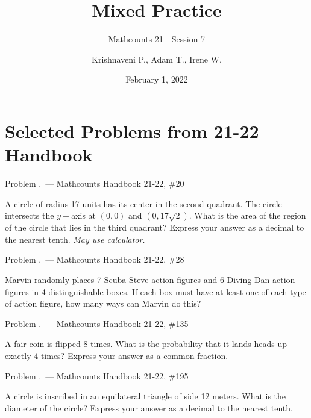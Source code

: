 \documentclass[9pt]{beamer}
\title{Mixed Practice}
\subtitle{Mathcounts 21 - Session 7}
\author{Krishnaveni P., Adam T., Irene W.}
\institute{BISV Mathcounts Club 21}
\date{February 1, 2022}
\newcounter{problem}[section]
\begin{document}
\begin{frame}
    \titlepage        
\end{frame}
\section{Selected Problems from 21-22 Handbook}
\begin{frame}[t, fragile]{Problem \thesection.\theproblem\ ---  Mathcounts Handbook 21-22, \#20}
    \begin{block}{}
    A circle of radius 17 units has its center in the second quadrant. The circle intersects the $y-$axis at $(0, 0)$ and $(0, 17\sqrt{2})$. What is the area of the region of the circle that lies in the third quadrant? Express your answer as a decimal to the nearest tenth. \textit{May use calculator.}
	
    \end{block}
\end{frame}
\begin{frame}[t, fragile]{Problem \thesection.\theproblem\ ---  Mathcounts Handbook 21-22, \#28}
    \begin{block}{}
    Marvin randomly places 7 Scuba Steve action figures and 6 Diving Dan action figures in 4 distinguishable boxes. If each box must have at least one of each type of action figure, how many ways can Marvin do this?
	
    \end{block}
\end{frame}
\begin{frame}[t, fragile]{Problem \thesection.\theproblem\ ---  Mathcounts Handbook 21-22, \#135}
    \begin{block}{}
    A fair coin is flipped 8 times. What is the probability that it lands heads up exactly 4 times? Express your answer as a common fraction.
	
    \end{block}
\end{frame}
\begin{frame}[t, fragile]{Problem \thesection.\theproblem\ ---  Mathcounts Handbook 21-22, \#195}
    \begin{block}{}
    A circle is inscribed in an equilateral triangle of side 12 meters. What is the diameter of the circle? Express your answer as a decimal to the nearest tenth.
	
    \end{block}
\end{frame}
\end{document}
